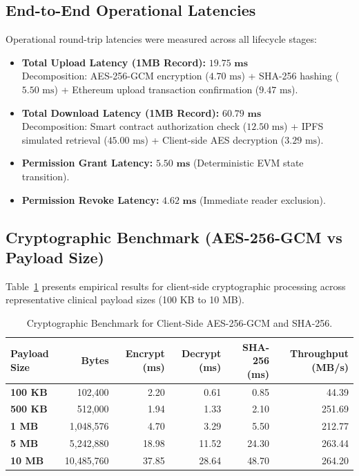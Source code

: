 \documentclass[11pt,a4paper]{article}
\begin{document}
\subsection{End-to-End Operational Latencies}
Operational round-trip latencies were measured across all lifecycle stages:
\begin{itemize}
    \item \textbf{Total Upload Latency (1MB Record):} $\mathbf{19.75\text{ ms}}$ \\
    Decomposition: AES-256-GCM encryption ($4.70\text{ ms}$) + SHA-256 hashing ($5.50\text{ ms}$) + Ethereum upload transaction confirmation ($9.47\text{ ms}$).
    \item \textbf{Total Download Latency (1MB Record):} $\mathbf{60.79\text{ ms}}$ \\
    Decomposition: Smart contract authorization check ($12.50\text{ ms}$) + IPFS simulated retrieval ($45.00\text{ ms}$) + Client-side AES decryption ($3.29\text{ ms}$).
    \item \textbf{Permission Grant Latency:} $\mathbf{5.50\text{ ms}}$ (Deterministic EVM state transition).
    \item \textbf{Permission Revoke Latency:} $\mathbf{4.62\text{ ms}}$ (Immediate reader exclusion).
\end{itemize}

\subsection{Cryptographic Benchmark (AES-256-GCM vs Payload Size)}
Table~\ref{tab:crypto} presents empirical results for client-side cryptographic processing across representative clinical payload sizes (100 KB to 10 MB).

\begin{table}[htbp]
\centering
\small
\caption{Cryptographic Benchmark for Client-Side AES-256-GCM and SHA-256.}
\label{tab:crypto}
\begin{tabular}{lrrrrr}
\toprule
\textbf{Payload Size} & \textbf{Bytes} & \textbf{Encrypt (ms)} & \textbf{Decrypt (ms)} & \textbf{SHA-256 (ms)} & \textbf{Throughput (MB/s)} \\
\midrule
\textbf{100 KB} & 102,400 & 2.20 & 0.61 & 0.85 & 44.39 \\
\textbf{500 KB} & 512,000 & 1.94 & 1.33 & 2.10 & 251.69 \\
\textbf{1 MB} & 1,048,576 & 4.70 & 3.29 & 5.50 & 212.77 \\
\textbf{5 MB} & 5,242,880 & 18.98 & 11.52 & 24.30 & 263.44 \\
\textbf{10 MB} & 10,485,760 & 37.85 & 28.64 & 48.70 & 264.20 \\
\bottomrule
\end{tabular}
\end{table}
\end{document}

